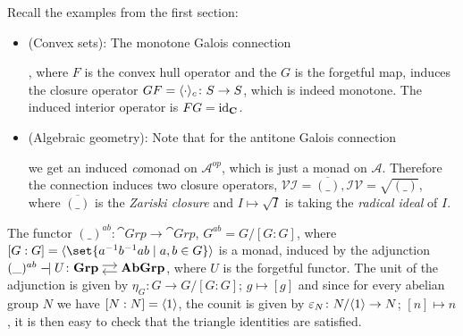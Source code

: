 \begin{example}
    Recall the examples from the first section:
    \begin{itemize}[topsep = 0pt,noitemsep]
        \item (Convex sets):
        The monotone Galois connection
        , where $F$ is the convex hull operator
        and the $G$ is the forgetful map, induces the closure operator $GF = \langle\cdot\rangle_c \colon S \to S$,
        which is indeed monotone. The induced interior operator is $FG = \operatorname{id}_{\mathbf{C}}$.
        \item (Algebraic geometry):
        Note that for the antitone Galois connection 
        we get an induced \textit{co}monad on 
        $\mathcal{A}^{op}$, which is just a monad on $\mathcal{A}$. Therefore the connection
        induces two closure operators, $\mathcal{VI} = \overline{(\_)}, \mathcal{IV}= \sqrt{(\_)}$,
        where $\overline{(\_)}$ is the \textit{Zariski closure} and $I \mapsto \sqrt{I}$ is taking
        the \textit{radical ideal} of $I$.
    \end{itemize}

\end{example}

\begin{example}[Abelianization]
    The functor $(\_)^{ab} \colon \cat{Grp} \to \cat{Grp}$,  $G^{ab} = 
    G/[G:G]$, where $[G:G] = \subgroup{\set{a^{-1}b^{-1}ab\mid a,b \in G}}$ is a monad,
    induced by the adjunction $(\_)^{ab} \adj U \colon \adjar{Grp}{AbGrp}$,
    where $U$ is the forgetful functor. The unit of the adjunction is given by
    $\eta_G \colon G \to G/[G:G]$; $g \mapsto [g]$ and 
    since for every abelian group $N$ we have $[N:N] = \langle1\rangle$, 
    the counit is given by
    $\varepsilon_N \colon N/\langle1\rangle \to N$; $[n] \mapsto n$, it is then easy
    to check that the triangle identities are satisfied.
\end{example}


